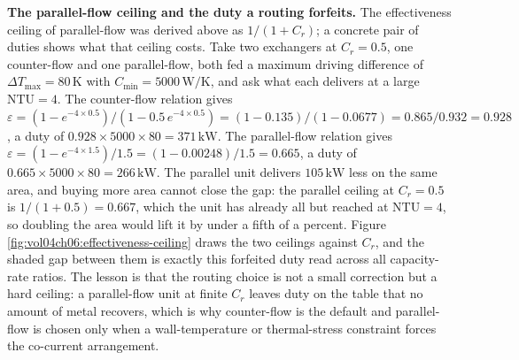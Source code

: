 \textbf{The parallel-flow ceiling and the duty a routing forfeits.} The
effectiveness ceiling of parallel-flow was derived above as $1/(1 + C_r)$; a
concrete pair of duties shows what that ceiling costs. Take two exchangers at
$C_r = 0.5$, one counter-flow and one parallel-flow, both fed a maximum driving
difference of $\Delta T_{\max} = 80\,\si{\kelvin}$ with $C_{\min} = 5000\,\si{\watt
\per\kelvin}$, and ask what each delivers at a large $\text{NTU} = 4$. The
counter-flow relation gives $\varepsilon = (1 - e^{-4\times 0.5})/(1 - 0.5\,e^{-4
\times 0.5}) = (1 - 0.135)/(1 - 0.0677) = 0.865/0.932 = 0.928$, a duty of
$0.928\times 5000\times 80 = 371\,\text{kW}$. The parallel-flow relation gives
$\varepsilon = (1 - e^{-4\times 1.5})/1.5 = (1 - 0.00248)/1.5 = 0.665$, a duty of
$0.665\times 5000\times 80 = 266\,\text{kW}$. The parallel unit delivers
$105\,\text{kW}$ less on the same area, and buying more area cannot close the gap:
the parallel ceiling at $C_r = 0.5$ is $1/(1 + 0.5) = 0.667$, which the unit has
already all but reached at $\text{NTU} = 4$, so doubling the area would lift it by
under a fifth of a percent. Figure \ref{fig:vol04ch06:effectiveness-ceiling} draws
the two ceilings against $C_r$, and the shaded gap between them is exactly this
forfeited duty read across all capacity-rate ratios. The lesson is that the routing
choice is not a small correction but a hard ceiling: a parallel-flow unit at finite
$C_r$ leaves duty on the table that no amount of metal recovers, which is why
counter-flow is the default and parallel-flow is chosen only when a wall-temperature
or thermal-stress constraint forces the co-current arrangement.



